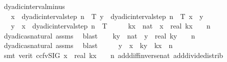 \begin{isabellebody}
\endisatagproof
{\isafoldproof}%
%
\isadelimproof
\isanewline
%
\endisadelimproof
\isanewline
{}\isamarkupfalse%
\ dyadic{\isacharunderscore}{\kern0pt}interval{\isacharunderscore}{\kern0pt}minus{\isacharcolon}{\kern0pt}\isanewline
\ \ \ {\isachardoublequoteopen}x\ {\isasymin}\ dyadic{\isacharunderscore}{\kern0pt}interval{\isacharunderscore}{\kern0pt}step\ n\ {}\ T{\isachardoublequoteclose}\ {\isachardoublequoteopen}y\ {\isasymin}\ dyadic{\isacharunderscore}{\kern0pt}interval{\isacharunderscore}{\kern0pt}step\ n\ {}\ T{\isachardoublequoteclose}\ {\isachardoublequoteopen}x\ {\isasymle}\ y{\isachardoublequoteclose}\isanewline
\ \ \ {\isachardoublequoteopen}y\ {\isacharminus}{\kern0pt}\ x\ {\isasymin}\ dyadic{\isacharunderscore}{\kern0pt}interval{\isacharunderscore}{\kern0pt}step\ n\ {}\ T{\isachardoublequoteclose}\isanewline
%
\isadelimproof
%
\endisadelimproof
%
\isatagproof
{}\isamarkupfalse%
\ {\isacharminus}{\kern0pt}\isanewline
\ \ \isamarkupfalse%
\ kx\ {\isacharcolon}{\kern0pt}{\isacharcolon}{\kern0pt}\ nat\ \ {\isachardoublequoteopen}x\ {\isacharequal}{\kern0pt}\ real\ kx\ {\isacharslash}{\kern0pt}\ {}\ {\isacharcircum}{\kern0pt}\ n{\isachardoublequoteclose}\isanewline
\ \ \ \ \isamarkupfalse%
\ dyadic{\isacharunderscore}{\kern0pt}as{\isacharunderscore}{\kern0pt}natural\ assms{\isacharparenleft}{\kern0pt}{}{\isacharparenright}{\kern0pt}\ \isamarkupfalse%
\ blast\isanewline
\ \ \isamarkupfalse%
\ ky\ {\isacharcolon}{\kern0pt}{\isacharcolon}{\kern0pt}\ nat\ \ {\isachardoublequoteopen}y\ {\isacharequal}{\kern0pt}\ real\ ky\ {\isacharslash}{\kern0pt}\ {}\ {\isacharcircum}{\kern0pt}\ n{\isachardoublequoteclose}\isanewline
\ \ \ \ \isamarkupfalse%
\ dyadic{\isacharunderscore}{\kern0pt}as{\isacharunderscore}{\kern0pt}natural\ assms{\isacharparenleft}{\kern0pt}{}{\isacharparenright}{\kern0pt}\ \isamarkupfalse%
\ blast\isanewline
\ \ \isamarkupfalse%
\ \isamarkupfalse%
\ {\isachardoublequoteopen}y\ {\isacharminus}{\kern0pt}\ x\ {\isacharequal}{\kern0pt}\ {\isacharparenleft}{\kern0pt}ky\ {\isacharminus}{\kern0pt}\ kx{\isacharparenright}{\kern0pt}\ {\isacharslash}{\kern0pt}\ {}{\isacharcircum}{\kern0pt}n{\isachardoublequoteclose}\isanewline
\ \ \ \ \isamarkupfalse%
\ {\isacharparenleft}{\kern0pt}smt\ {\isacharparenleft}{\kern0pt}verit{\isacharcomma}{\kern0pt}\ ccfv{\isacharunderscore}{\kern0pt}SIG{\isacharparenright}{\kern0pt}\ {\isacartoucheopen}x\ {\isacharequal}{\kern0pt}\ real\ kx\ {\isacharslash}{\kern0pt}\ {}\ {\isacharcircum}{\kern0pt}\ n{\isacartoucheclose}\ add{\isacharunderscore}{\kern0pt}diff{\isacharunderscore}{\kern0pt}inverse{\isacharunderscore}{\kern0pt}nat\ add{\isacharunderscore}{\kern0pt}divide{\isacharunderscore}{\kern0pt}distrib\ \isanewline

\end{isabellebody}
